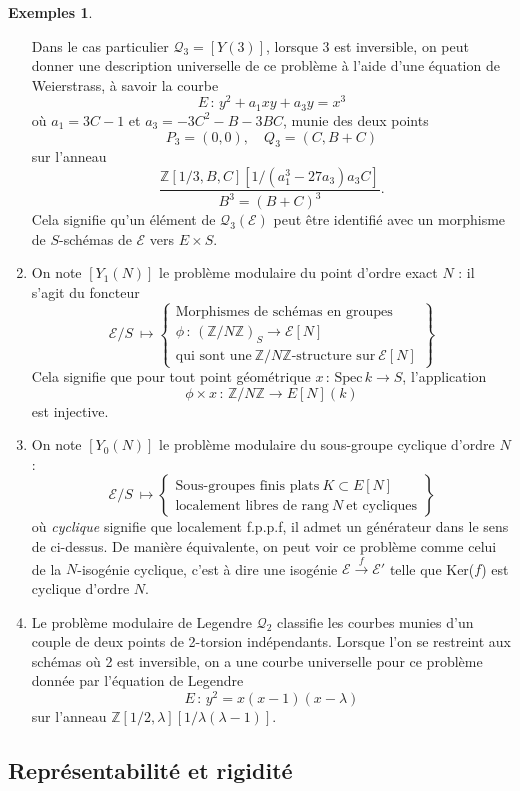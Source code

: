 \documentclass[11pt,a4paper]{article}
\newcommand{\Z}{\mathbb{Z}}
\newcommand{\E}{\mathcal{E}}
\newcommand{\Qr}{\mathcal{Q}}
\newcommand{\vers}{\longrightarrow}
\newcommand{\Spec}{\mathrm{Spec}\,}
\newcommand{\de}{\,:\,}
\theoremstyle{definition}
\newtheorem*{ex}{Exemples}
\begin{document}
\begin{ex}
\begin{enumerate}
Dans le cas particulier $\Qr_3 = [Y(3)]$, lorsque 3 est inversible, on peut donner une description universelle de ce problème à l'aide d'une équation de Weierstrass, à savoir la courbe
$$E\de y^2 + a_1 x y + a_3 y = x^3$$
où $a_1 = 3C - 1$ et $a_3 = -3 C^2 - B - 3 BC$, munie des deux points
$$P_3 = (0,0), \quad Q_3 = (C, B+C)$$
sur l'anneau
$$\frac{\Z[1/3, B, C][1/(a_1^3 - 27 a_3)a_3 C]}{B^3 = (B+C)^3}.$$
Cela signifie qu'un élément de $\Qr_3(\E)$ peut être identifié avec un morphisme de $S$-schémas de $\E$ vers $E\times S$.
\item On note $[Y_1(N)]$ le problème modulaire du point d'ordre exact $N$ : il s'agit du foncteur
$$ \E/S\ \longmapsto \left\{
\begin{matrix}
\text{Morphismes\ de\ schémas\ en\ groupes}\\
\phi\de (\Z/N\Z)_S\vers \E[N]\ \\
\text{qui\ sont\ une}\ \Z/N\Z \text{-structure\ sur}\ \E[N]
\end{matrix}
\right\}$$
Cela signifie que pour tout point géométrique $x\de\Spec k\vers S$, l'application
$$\phi \times x\de \Z/N\Z \vers E[N](k)$$
est injective.
\item On note $[Y_0(N)]$ le problème modulaire du sous-groupe cyclique d'ordre $N$ :
$$ \E/S\ \longmapsto \left\{
\begin{matrix}
\text{Sous-groupes finis plats}\ K\subset E[N]\\
 \text{localement libres de rang}\ N\ \text{et cycliques}
\end{matrix}
\right\}$$
où \emph{cyclique} signifie que localement f.p.p.f, il admet un générateur dans le sens de ci-dessus. De manière équivalente, on peut voir ce problème comme celui de la $N$-isogénie cyclique, c'est à dire une isogénie $\E \overset{f}{\vers} \E'$ telle que Ker($f$) est cyclique d'ordre $N$.
\item Le problème modulaire de Legendre $\Qr_2$ classifie les courbes munies d'un couple de deux points de 2-torsion indépendants. Lorsque l'on se restreint aux schémas où 2 est inversible, on a une courbe universelle pour ce problème donnée par l'équation de Legendre
$$ E\de y^2 = x (x-1) (x-\lambda)$$
sur l'anneau $\Z[1/2,\lambda][1/\lambda(\lambda -1)].$
\end{enumerate}
\end{ex}

\subsection{Représentabilité et rigidité}
\end{document}
